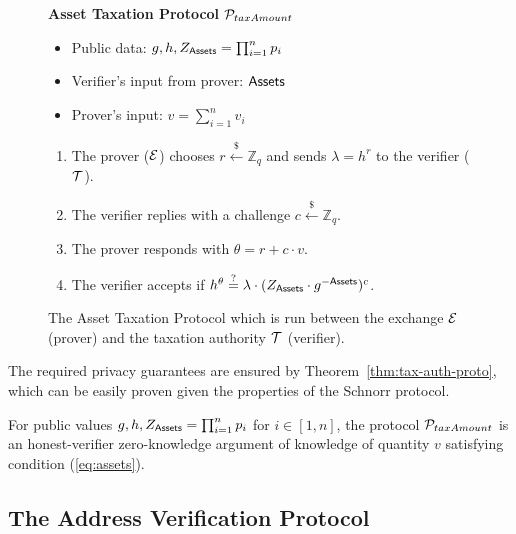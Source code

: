 \begin{figure}[h]
\begin{mdframed}

\begin{center}
    \textbf{Asset Taxation Protocol} $\mathcal{P}_{taxAmount}$
\end{center}

    \begin{itemize}
        \item Public data: $g, h, Z_{\mathsf{Assets}} = \prod_{i = 1}^n p_i$
        \item Verifier's input from prover: $\mathsf{Assets}$
        \item Prover's input: $v = \sum_{i = 1}^n v_i$
    \end{itemize}

    \begin{enumerate}
        \item The prover ($\mathcal{E}$) chooses $r \xleftarrow{\$} \mathbb{Z}_q$
            and sends $\lambda = h^r$ to the verifier ($\mathcal{T}$).
        \item The verifier replies with a challenge $c \xleftarrow{\$} \mathbb{Z}_q$.
        \item The prover responds with $\theta = r + c \cdot v$.
        \item The verifier accepts if $h^\theta \stackrel{?}{=} \lambda \cdot (Z_{\mathsf{Assets}} \cdot g^{-\mathsf{Assets}})^c$.
    \end{enumerate}

\end{mdframed}
\caption{
    The Asset Taxation Protocol which is run between the exchange $\mathcal{E}$
    (prover) and the taxation authority $\mathcal{T}$ (verifier).
}
\label{fig:taxation_auth_proto}
\end{figure}

The required privacy guarantees are ensured by
Theorem~\ref{thm:tax-auth-proto}, which can be easily proven given the
properties of the Schnorr protocol.

\begin{theorem}\label{thm:tax-auth-proto}
    For public values $g, h, Z_{\mathsf{Assets}} = \prod_{i = 1}^n p_i$ for $i \in [1,
    n]$, the protocol $\mathcal{P}_{taxAmount}$ is an honest-verifier zero-knowledge
    argument of knowledge of quantity $v$ satisfying condition (\ref{eq:assets}).
\end{theorem}

\subsection{The Address Verification Protocol}\label{subsec:user-verification-proto}

